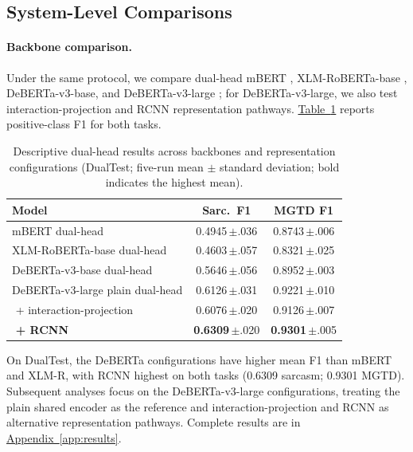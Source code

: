 \documentclass[11pt]{article}
\newcommand{\Appref}[1]{\hyperref[#1]{Appendix~\ref*{#1}}}
\newcommand{\Tabref}[1]{\hyperref[#1]{Table~\ref*{#1}}}
\begin{document}
\subsection{System-Level Comparisons}
\label{sec:backbone}

\paragraph{Backbone comparison.} Under the same protocol, we compare dual-head mBERT \citep{devlin2019bert}, XLM-RoBERTa-base \citep{conneau2020xlmr}, DeBERTa-v3-base, and DeBERTa-v3-large \citep{he2023debertav3}; for DeBERTa-v3-large, we also test interaction-projection and RCNN representation pathways. \Tabref{tab:backbone} reports positive-class F1 for both tasks.

\begin{table}[t]
  \centering
  \footnotesize
  \setlength{\tabcolsep}{2pt}
  \begin{tabular}{@{}p{3.25cm}cc@{}}
    \toprule
    \textbf{Model} & \textbf{Sarc.\ F1} & \textbf{MGTD F1} \\
    \midrule
    mBERT dual-head & 0.4945\,$\pm$.036 & 0.8743\,$\pm$.006 \\
    XLM-RoBERTa-base dual-head & 0.4603\,$\pm$.057 & 0.8321\,$\pm$.025 \\
    DeBERTa-v3-base dual-head & 0.5646\,$\pm$.056 & 0.8952\,$\pm$.003 \\
    DeBERTa-v3-large plain dual-head & 0.6126\,$\pm$.031 & 0.9221\,$\pm$.010 \\
    \,\,+ interaction-projection & 0.6076\,$\pm$.020 & 0.9126\,$\pm$.007 \\
    \textbf{\,\,+ RCNN} & \textbf{0.6309}\,$\pm$.020 & \textbf{0.9301}\,$\pm$.005 \\
    \bottomrule
  \end{tabular}
  \caption{Descriptive dual-head results across backbones and representation configurations (DualTest; five-run mean $\pm$ standard deviation; bold indicates the highest mean).}
  \label{tab:backbone}
\end{table}

On DualTest, the DeBERTa configurations have higher mean F1 than mBERT and XLM-R, with RCNN highest on both tasks (0.6309 sarcasm; 0.9301 MGTD). Subsequent analyses focus on the DeBERTa-v3-large configurations, treating the plain shared encoder as the reference and interaction-projection and RCNN as alternative representation pathways. Complete results are in \Appref{app:results}.
\end{document}
